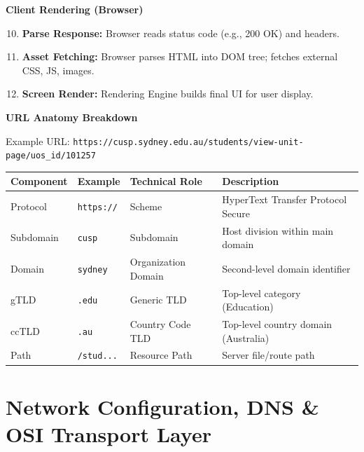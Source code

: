 \documentclass[8pt, a4paper]{article}
\begin{document}
\begin{conceptbox}
\textbf{Client Rendering (Browser)}
\begin{enumerate}
  \setcounter{enumi}{9}
  \item \textbf{Parse Response:} Browser reads status code (e.g., 200 OK) and headers.
  \item \textbf{Asset Fetching:} Browser parses HTML into DOM tree; fetches external CSS, JS, images.
  \item \textbf{Screen Render:} Rendering Engine builds final UI for user display.
\end{enumerate}
\end{conceptbox}

\medskip

\begin{conceptbox}
\textbf{URL Anatomy Breakdown}

\smallskip
Example URL: \texttt{https://cusp.sydney.edu.au/students/view-unit-page/uos\_id/101257}

\smallskip
\begin{tabularx}{\linewidth}{l l l X}
  \toprule
  \textbf{Component} & \textbf{Example} & \textbf{Technical Role} & \textbf{Description} \\
  \midrule
  Protocol  & \texttt{https://} & Scheme              & HyperText Transfer Protocol Secure \\
  Subdomain & \texttt{cusp}     & Subdomain           & Host division within main domain \\
  Domain    & \texttt{sydney}   & Organization Domain & Second-level domain identifier \\
  gTLD      & \texttt{.edu}     & Generic TLD         & Top-level category (Education) \\
  ccTLD     & \texttt{.au}      & Country Code TLD    & Top-level country domain (Australia) \\
  Path      & \texttt{/stud...} & Resource Path       & Server file/route path \\
  \bottomrule
\end{tabularx}
\end{conceptbox}

\section{Network Configuration, DNS \& OSI Transport Layer}
\end{document}
